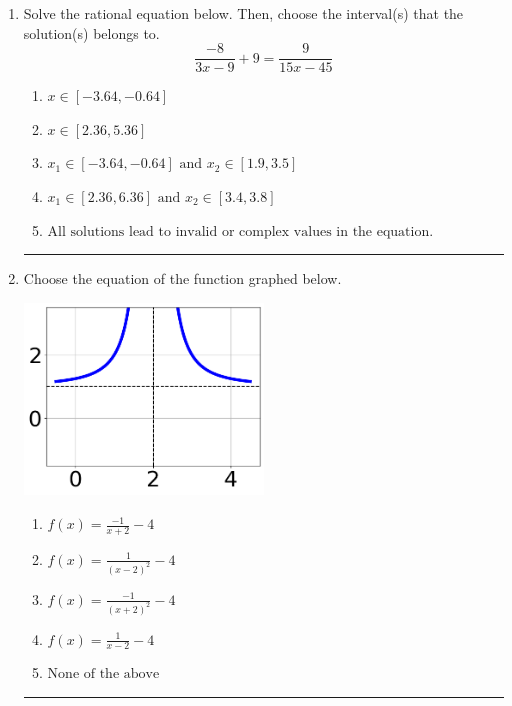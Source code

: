 \documentclass[14pt]{extbook}
\newcommand{\litem}[1]{\item#1\hspace*{-1cm}\rule{\textwidth}{0.4pt}}
\begin{document}
\begin{enumerate}
{\begin{enumerate}[label=\Alph*.]
\end{enumerate} }
\litem{
Solve the rational equation below. Then, choose the interval(s) that the solution(s) belongs to.\[ \frac{-8}{3x -9} + 9 = \frac{9}{15x -45} \]\begin{enumerate}[label=\Alph*.]
\item \( x \in [-3.64,-0.64] \)
\item \( x \in [2.36,5.36] \)
\item \( x_1 \in [-3.64, -0.64] \text{ and } x_2 \in [1.9,3.5] \)
\item \( x_1 \in [2.36, 6.36] \text{ and } x_2 \in [3.4,3.8] \)
\item \( \text{All solutions lead to invalid or complex values in the equation.} \)

\end{enumerate} }
\litem{
Choose the equation of the function graphed below.
\begin{center}
    \includegraphics[width=0.5\textwidth]{../Figures/rationalGraphToEquationCopyA.png}
\end{center}
\begin{enumerate}[label=\Alph*.]
\item \( f(x) = \frac{-1}{x + 2} - 4 \)
\item \( f(x) = \frac{1}{(x - 2)^2} - 4 \)
\item \( f(x) = \frac{-1}{(x + 2)^2} - 4 \)
\item \( f(x) = \frac{1}{x - 2} - 4 \)
\item \( \text{None of the above} \)


\end{enumerate}}
\end{enumerate}
\end{document}
